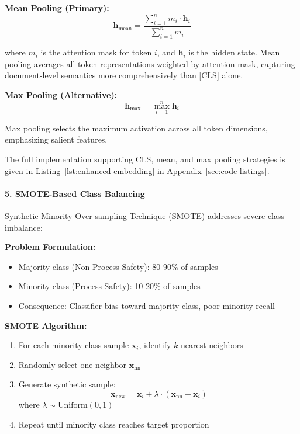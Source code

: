\documentclass[11pt, titlepage, bibliography=totoc]{scrreprt}
\begin{document}
\textbf{Mean Pooling (Primary):}
\begin{equation}
\mathbf{h}_{\text{mean}} = \frac{\sum_{i=1}^{n} m_i \cdot \mathbf{h}_i}{\sum_{i=1}^{n} m_i}
\end{equation}

where $m_i$ is the attention mask for token $i$, and $\mathbf{h}_i$ is the hidden state. Mean pooling averages all token representations weighted by attention mask, capturing document-level semantics more comprehensively than [CLS] alone.

\textbf{Max Pooling (Alternative):}
\begin{equation}
\mathbf{h}_{\text{max}} = \max_{i=1}^{n} \mathbf{h}_i
\end{equation}

Max pooling selects the maximum activation across all token dimensions, emphasizing salient features.

The full implementation supporting CLS, mean, and max pooling strategies is given in Listing~\ref{lst:enhanced-embedding} in Appendix~\ref{sec:code-listings}.

\paragraph{5. SMOTE-Based Class Balancing}
Synthetic Minority Over-sampling Technique (SMOTE) addresses severe class imbalance:

\textbf{Problem Formulation:}
\begin{itemize}
    \item Majority class (Non-Process Safety): 80-90\% of samples
    \item Minority class (Process Safety): 10-20\% of samples
    \item Consequence: Classifier bias toward majority class, poor minority recall
\end{itemize}

\textbf{SMOTE Algorithm:}
\begin{enumerate}
    \item For each minority class sample $\mathbf{x}_i$, identify $k$ nearest neighbors
    \item Randomly select one neighbor $\mathbf{x}_{\text{nn}}$
    \item Generate synthetic sample:
    \begin{equation}
    \mathbf{x}_{\text{new}} = \mathbf{x}_i + \lambda \cdot (\mathbf{x}_{\text{nn}} - \mathbf{x}_i)
    \end{equation}
    where $\lambda \sim \text{Uniform}(0, 1)$
    \item Repeat until minority class reaches target proportion
\end{enumerate}
\end{document}
